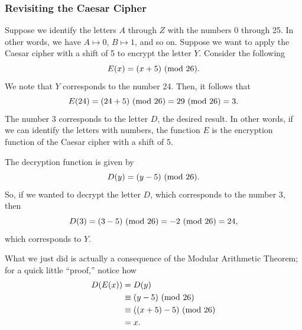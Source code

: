 \documentclass[letterpaper]{article}
\begin{document}
\subsubsection{Revisiting the Caesar Cipher}
Suppose we identify the letters $A$ through $Z$ with the numbers 0 through 25. In other words, we have $A \mapsto 0$, $B \mapsto 1$, and so on. Suppose we want to apply the Caesar cipher with a shift of 5 to encrypt the letter $Y$. Consider the following 
\[E(x) = (x + 5) \ (\mathrm{mod}\ 26).\]
We note that $Y$ corresponds to the number 24. Then, it follows that 
\[E(24) = (24 + 5) \ (\mathrm{mod}\ 26) = 29 \ (\mathrm{mod}\ 26) = 3.\]
The number 3 corresponds to the letter $D$, the desired result. In other words, if we can identify the letters with numbers, the function $E$ is the encryption function of the Caesar cipher with a shift of 5.  

\bigskip 

The decryption function is given by 
\[D(y) = (y - 5) \ (\mathrm{mod}\ 26).\]
So, if we wanted to decrypt the letter $D$, which corresponds to the number 3, then 
\[D(3) = (3 - 5) \ (\mathrm{mod}\ 26) = -2 \ (\mathrm{mod}\ 26) = 24,\]
which corresponds to $Y$. 

\bigskip 

What we just did is actually a consequence of the Modular Arithmetic Theorem; for a quick little ``proof,'' notice how  
\begin{equation*}
    \begin{aligned}
        D(E(x)) &= D(y) \\
            &\equiv (y - 5) \ (\mathrm{mod}\ 26) \\ 
            &\equiv ((x + 5) - 5) \ (\mathrm{mod}\ 26) \\ 
            &= x.
    \end{aligned} 
\end{equation*}
\end{document}
